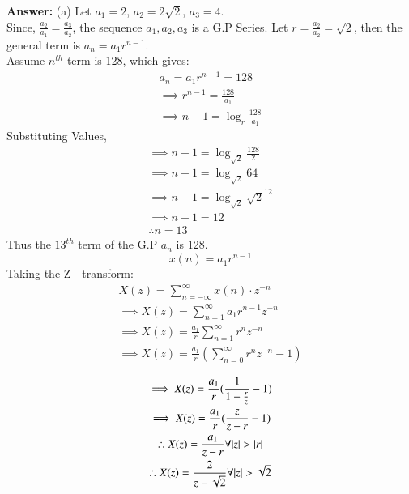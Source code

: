 \documentclass[journal,12pt,twocolumn]{IEEEtran}
\theoremstyle{remark}
\begin{document}
\textbf{Answer:} (a) Let $a_1 = 2$, $a_2 = 2\sqrt{2}$, $a_3 = 4$.\\
Since, $\frac{a_2}{a_1} = \frac{a_3}{a_2}$, the sequence $a_1, a_2, a_3$ is a G.P Series.
Let $r = \frac{a_2}{a_2} = \sqrt{2}$, then the general term is $a_n = a_1 r^{n-1}$.\\
Assume $n^{th}$ term is 128, which gives: 
\begin{gather*}
    a_n = a_1 r^{n-1} = 128\\
    \implies r^{n-1} = \frac{128}{a_1}\\
    \implies n - 1 = \log_{r}{\frac{128}{a_1}}
\end{gather*}
Substituting Values,
\begin{gather*}
    \implies n - 1 = \log_{\sqrt{2}}{\frac{128}{2}}\\
    \implies n - 1 = \log_{\sqrt{2}}{64}\\
    \implies n - 1 = \log_{\sqrt{2}}{\sqrt{2}^{12}}\\
    \implies n - 1 = 12\\
    \therefore n = 13
\end{gather*}
Thus the $13^{th}$ term of the G.P $a_n$ is 128.\\ 
\[ x(n) = a_1r^{n - 1}
\]
Taking the Z - transform:
\begin{gather*}
    X(z) = \sum_{n = -\infty}^{\infty}{x(n) \cdot z^{-n}}\\
    \implies X(z) = \sum_{n = 1}^{\infty}{a_1r^{n - 1}z^{-n}}\\
    \implies X(z) = \frac{a_1}{r}\sum_{n = 1}^{\infty}{r^n z^{-n}}\\
    \implies X(z) = \frac{a_1}{r}(\sum_{n = 0}^{\infty}{r^n z^{-n}} - 1)\\
\end{gather*}
\begin{gather*}
    \implies X(z) = \frac{a_1}{r}(\frac{1}{1 - \frac{r}{z}} - 1)\\
    \implies X(z) = \frac{a_1}{r}(\frac{z}{z - r} - 1)\\
    \therefore X(z) = \frac{a_1}{z - r}\forall { \left\vert z\right\vert > \left\vert r\right\vert}\\
    \therefore X(z) = \frac{2}{z - \sqrt{2}}\forall { \left\vert z\right\vert > \sqrt{2}}
\end{gather*}
\end{document}

